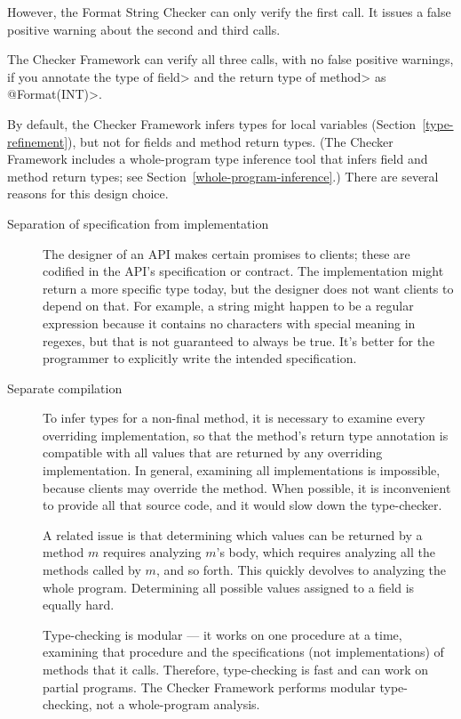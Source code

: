 \noindent
However, the Format String Checker can only verify the first call.  It issues a
false positive warning about the second and third calls.

The Checker Framework can verify all three calls, with no false positive
warnings, if you annotate the type of \<field> and the return type of
\<method> as \<@Format(INT)>.

By default, the Checker Framework infers types for local variables
(Section~\ref{type-refinement}), but not for fields and method return
types.  (The Checker Framework includes a whole-program type inference tool
that infers field and method return types; see
Section~\ref{whole-program-inference}.)
There are several reasons for this design choice.

\begin{description}
\item[Separation of specification from implementation]
  The designer of an API makes certain promises to clients; these are
  codified in the API's specification or contract.  The implementation
  might return a more specific type today, but the designer does not want
  clients to depend on that.  For example, a string might happen to be a
  regular expression because it contains no characters with special meaning
  in regexes, but that is not guaranteed to always be true.  It's better
  for the programmer to explicitly write the intended specification.

\item[Separate compilation]
  To infer types for a non-final method, it is necessary to examine every
  overriding implementation, so that the method's return type annotation is
  compatible with all values that are returned by any overriding
  implementation.  In general, examining all implementations is impossible,
  because clients may override the method.  When possible, it is
  inconvenient to provide all that source code, and it would slow down the
  type-checker.

  A related issue is that determining which values can be returned by a
  method $m$ requires analyzing $m$'s body, which requires analyzing
  all the methods called by $m$, and so forth.  This quickly devolves to
  analyzing the whole program.
  Determining all possible values assigned to a field is equally hard.

  Type-checking is modular --- it works on one procedure at a time,
  examining that procedure and the specifications (not implementations) of
  methods that it calls.  Therefore, type-checking is fast and can work on
  partial programs.  The Checker Framework performs modular type-checking,
  not a whole-program analysis.


\end{description}
